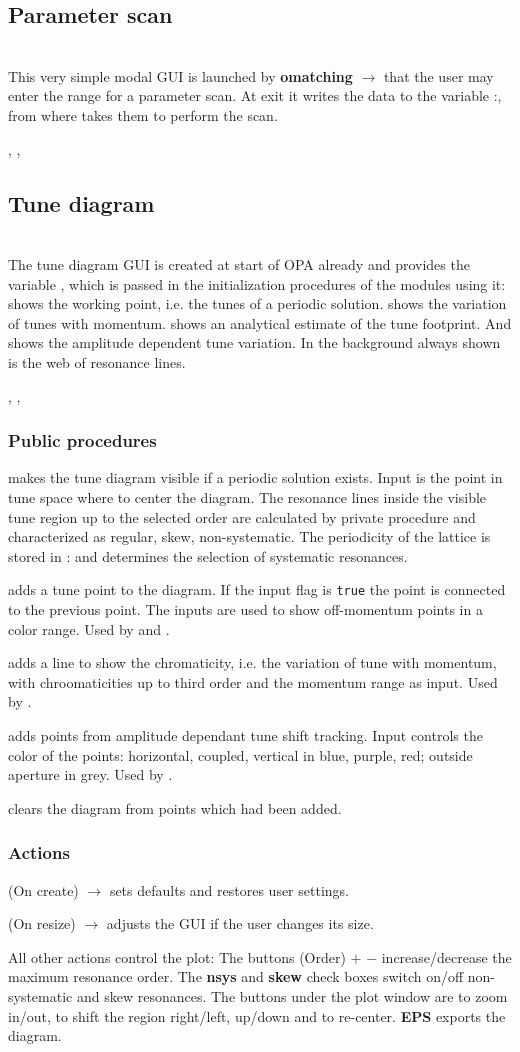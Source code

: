 \documentclass[12pt]{article}
\newcommand\code[1]{{\tt #1}}
\newcommand{\ofld}[1]{\colorbox{black!15}{{{\color{black}\bf #1}}}}
\newcommand{\ofldx}[1]{\colorbox{black!15}{{\color{black}(#1)}}}
\newcommand\guico[1]{{\color{blue}\code{#1}}}
\newcommand{\unico}[1]{{\color{burntorange}\code{#1}}}
\newcommand{\evcod}[2]{\ofld{#1} $\rightarrow$ \guico{#2}}
\newcommand{\evcodx}[2]{\ofldx{#1} $\rightarrow$ \guico{#2}}
\newcommand{\vrcod}[2]{\opauni{#1}:\unico{#2}}
\newcommand{\opagui}[1]{\colorbox{blue!20}{{\color{black}\code{#1}}}}
\newcommand{\oguih}[2]{\subsection{\label{#2}#1}{\Huge\opagui{#2}}\\}
\newcommand{\ogui}[1]{\hyperref[#1]{\opagui{#1}}}
\newcommand{\opaguif}[1]{\colorbox{violet!30}{{\color{black}\code{#1}}}}
\newcommand{\oguif}[1]{\hyperref[#1]{\opaguif{#1}}}
\newcommand{\opauni}[1]{\colorbox{orange!30}{{\color{black}\code{#1}}}}
\newcommand{\ouni}[1]{\hyperref[#1]{\opauni{#1}}}
\newcommand{\uses}[1]{\flushleft {\bf Uses:} #1}
\newcommand{\desc}[1]{#1}
\newcommand{\act}[1]{\subsubsection*{Actions} #1}
\newcommand{\ppro}[1]{\subsubsection*{Public procedures} #1}
\begin{document}
\oguih{Parameter scan}{omatchscan}

\desc{This very simple modal GUI is launched by \evcod{omatching}{ScanClick} that the user may enter the range for a parameter scan. At exit it writes the data to the variable \vrcod{linoplib}{ScanPar}, from where \ogui{omatching} takes them to perform the scan.}

\uses{\ouni{linoplib}, \ouni{globlib}, \ouni{comauxlib}} 


\oguih{Tune diagram}{opatunediag}

\desc{The tune diagram GUI is created at start of OPA already and provides the variable \guico{tuneplot}, which is passed in the initialization procedures of the modules using it: \ogui{opalinop} shows the working point, i.e. the tunes of a periodic solution. \ogui{opamomentum} shows the variation of tunes with momentum. \ogui{opachroma} shows an analytical estimate of the tune footprint. And \ogui{opatrackps} shows the amplitude dependent tune variation. In the background always shown is the web of resonance lines.}

\uses{\ouni{globlib}, \oguif{comfigureframe}, \ouni{comauxlib}}

\ppro{
\guico{Diagram} makes the tune diagram visible if a periodic solution exists. Input is the point in tune space where to center the diagram.  The resonance lines inside the visible tune region up to the selected order are calculated by private procedure \unico{getLines} and characterized as regular, skew, non-systematic.  The periodicity of the lattice is stored in \vrcod{globlib}{NPer} and determines the selection of systematic resonances. 

\guico{AddTunePoint} adds a tune point to the diagram. If the input flag \guico{connect} is \code{true} the point is connected to the previous point. The inputs \guico{dpp, dppmax} are used to show off-momentum points in a color range. Used by \ogui{opalinop} and \ogui{opamomentum}.

\guico{AddChromLine} adds a line to show the chromaticity, i.e. the variation of tune with momentum, with chroomaticities up to third order and the momentum range as input. Used by \ogui{opachroma}.

\guico{AddTushPoint} adds points from amplitude dependant tune shift tracking. Input \guico{xmy} controls the color of the points: horizontal, coupled, vertical in blue, purple, red; outside aperture in grey. Used by \ogui{opatrackps}.

\guico{Refresh} clears the diagram from points which had been added.
}
\act{
\evcodx{On create}{FormCreate} sets defaults and restores user settings.

\evcodx{On resize}{FormResize} adjusts the GUI if the user changes its size.

All other actions control the plot: The buttons \ofldx{Order} \ofld{$+$} \ofld{$-$} increase/decrease the maximum resonance order. The \ofld{nsys} and \ofld{skew} check boxes switch on/off non-systematic and skew resonances. The buttons under the plot window are to zoom in/out, to shift the region right/left, up/down and to re-center. \ofld{EPS} exports the diagram.
}
\end{document}
